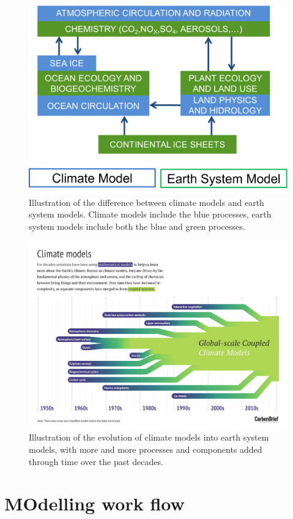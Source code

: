 \documentclass[12pt,oneside]{book}
\begin{document}
\begin{figure}

{\centering \includegraphics[width=0.8\linewidth]{figures/chap9/f94_ESM_GCM} 

}

\caption{Illustration of the difference between climate models and earth system models. Climate models include the blue processes, earth system models include both the blue and green processes.}\label{fig:f94}
\end{figure}

\begin{figure}

{\centering \includegraphics[width=0.8\linewidth]{figures/chap9/f95_GCM_timeline} 

}

\caption{Illustration of the evolution of climate models into earth system models, with more and more processes and components added through time over the past decades.}\label{fig:f95}
\end{figure}

\section{MOdelling work flow}\label{modelling-work-flow}
\end{document}

